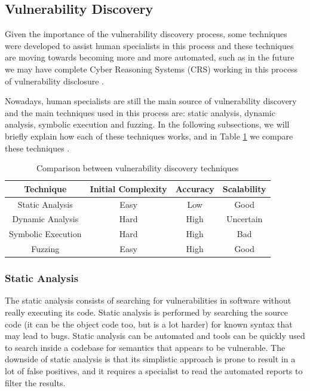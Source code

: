 \subsection{Vulnerability Discovery}
\label{subsec:vuln-disc}

Given the importance of the vulnerability discovery process, some techniques were developed to assist human specialists in this process and these techniques are moving towards becoming more and more automated, such as in the future we may have complete Cyber Reasoning Systems (CRS) working in this process of vulnerability disclosure \cite{crs}.

Nowadays, human specialists are still the main source of vulnerability discovery and the main techniques used in this process are: static analysis, dynamic analysis, symbolic execution and fuzzing. In the following subsections, we will briefly explain how each of these techniques works, and in Table \ref{tab:disc-techniques} we compare these techniques \cite{fuzzing}.

\begin{table}[h]
    \centering
    \caption{Comparison between vulnerability discovery techniques}
        \begin{tabular}{|c|c|c|c|}
        \hline
        \textbf{Technique}   & \textbf{Initial Complexity} & \textbf{Accuracy} & \textbf{Scalability} \\ \hline
        Static Analysis    & Easy      & Low   & Good         \\ 
        Dynamic Analysis   & Hard      & High  & Uncertain    \\ 
        Symbolic Execution & Hard      & High  & Bad          \\ 
        Fuzzing            & Easy      & High  & Good         \\ \hline
        \end{tabular}%
    \label{tab:disc-techniques}
\end{table}

\subsubsection{Static Analysis}

The static analysis consists of searching for vulnerabilities in software without really executing its code. Static analysis is performed by searching the source code (it can be the object code too, but is a lot harder) for known syntax that may lead to bugs. Static analysis can be automated and tools can be quickly used to search inside a codebase for semantics that appears to be vulnerable. The downside of static analysis is that its simplistic approach is prone to result in a lot of false positives, and it requires a specialist to read the automated reports to filter the results.

